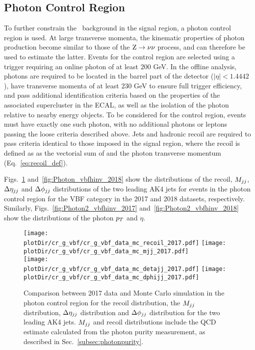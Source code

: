 \clearpage

\subsection{Photon Control Region}
\label{sec:selection_cr_g}

To further constrain the \Zvv \ background in the signal region, a photon control region is used.
At large transverse momenta, the kinematic properties of photon production become similar to those of the $\mathrm{Z}\to\nu\nu$ process, 
and can therefore be used to estimate the latter. Events for the control region are selected using a trigger requiring 
an online photon \pt of at least $200$ GeV. In the offline analysis, photons are required to be located in the barrel 
part of the detector ($|\eta|<1.4442$), have transverse momenta of at least $230$ GeV to ensure full trigger efficiency, 
and pass additional identification criteria based on the properties of the associated supercluster in the ECAL, 
as well as the isolation of the photon relative to nearby energy objects. To be considered for the control region, 
events must have exactly one such photon, with no additional photons or leptons passing the loose criteria described above. 
Jets and hadronic recoil are required to pass criteria identical to those imposed in the signal region, where the recoil 
is defined as as the vectorial sum of \ptvecmiss and the photon transverse momentum (Eq.~\ref{eq:recoil_def}).

Figs.~\ref{fig:Photon_vbfhinv_2017} and~\ref{fig:Photon_vbfhinv_2018} show the distributions of the recoil, $M_{jj}$, $\Delta \eta_{jj}$ and 
$\Delta \phi_{jj}$ distributions of the two leading AK4 jets for events in the photon control region for the VBF category in the 
2017 and 2018 datasets, respectively. Similarly, Figs.~\ref{fig:Photon2_vbfhinv_2017} and~\ref{fig:Photon2_vbfhinv_2018} 
show the distributions of the photon $p_T$ and $\eta$.

\begin{figure}[htbp]
    \begin{center}
        \texttt{[image: \\plotDir/cr\_g\_vbf/cr\_g\_vbf\_data\_mc\_recoil\_2017.pdf]}
        \texttt{[image: \\plotDir/cr\_g\_vbf/cr\_g\_vbf\_data\_mc\_mjj\_2017.pdf]} \\
        \texttt{[image: \\plotDir/cr\_g\_vbf/cr\_g\_vbf\_data\_mc\_detajj\_2017.pdf]}
        \texttt{[image: \\plotDir/cr\_g\_vbf/cr\_g\_vbf\_data\_mc\_dphijj\_2017.pdf]}
    \end{center}
    \caption{Comparison between 2017 data and Monte Carlo simulation in the photon control region for
        the recoil distribution, the $M_{jj}$ distribution, $\Delta \eta_{jj}$ distribution and $\Delta \phi_{jj}$ distribution
        for the two leading AK4 jets. $M_{jj}$ and recoil distributions include the QCD estimate
        calculated from the photon purity measurement, as described in Sec.~\ref{subsec:photonpurity}. }
    \label{fig:Photon_vbfhinv_2017}
\end{figure}

